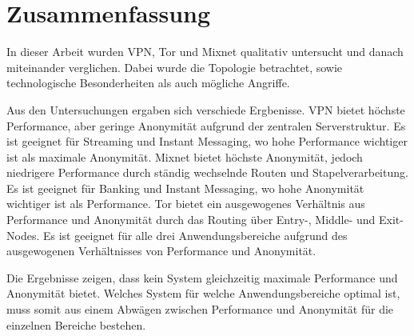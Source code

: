 \section{Zusammenfassung}

In dieser Arbeit wurden VPN, Tor und Mixnet qualitativ untersucht und danach miteinander verglichen. Dabei wurde die Topologie betrachtet, sowie technologische Besonderheiten als auch mögliche Angriffe.

Aus den Untersuchungen ergaben sich verschiede Ergbenisse.
VPN bietet höchste Performance, aber geringe Anonymität aufgrund der zentralen Serverstruktur. Es ist geeignet für Streaming und Instant Messaging, wo hohe Performance wichtiger ist als maximale Anonymität.
Mixnet bietet höchste Anonymität, jedoch niedrigere Performance durch ständig wechselnde Routen und Stapelverarbeitung. Es ist geeignet für Banking und Instant Messaging, wo hohe Anonymität wichtiger ist als Performance.
Tor bietet ein ausgewogenes Verhältnis aus Performance und Anonymität durch das Routing über Entry-, Middle- und Exit-Nodes. Es ist geeignet für alle drei Anwendungsbereiche aufgrund des ausgewogenen Verhältnisses von Performance und Anonymität.

Die Ergebnisse zeigen, dass kein System gleichzeitig maximale Performance und Anonymität bietet. Welches System für welche Anwendungsbereiche optimal ist, muss somit aus einem Abwägen zwischen Performance und Anonymität für die einzelnen Bereiche bestehen.
